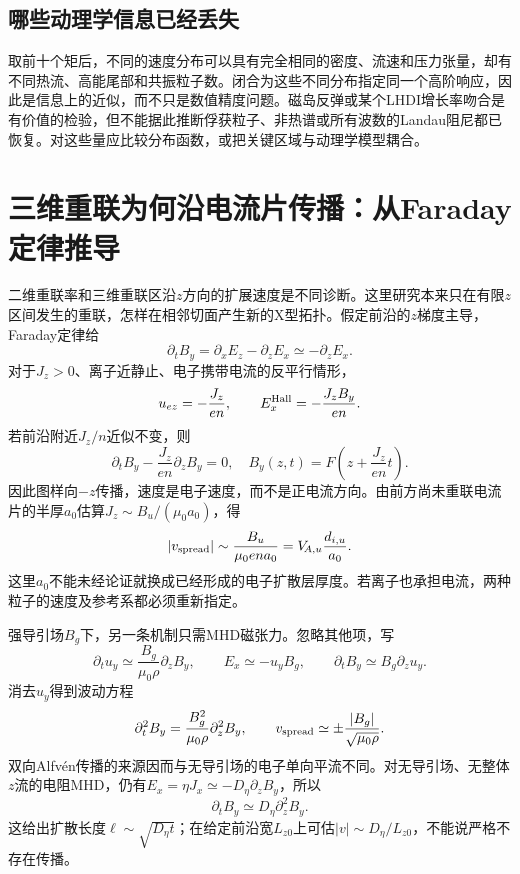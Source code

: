 \subsection{哪些动理学信息已经丢失}
取前十个矩后，不同的速度分布可以具有完全相同的密度、流速和压力张量，却有不同热流、高能尾部和共振粒子数。闭合为这些不同分布指定同一个高阶响应，因此是信息上的近似，而不只是数值精度问题。磁岛反弹或某个LHDI增长率吻合是有价值的检验，但不能据此推断俘获粒子、非热谱或所有波数的Landau阻尼都已恢复。对这些量应比较分布函数，或把关键区域与动理学模型耦合。

\section{三维重联为何沿电流片传播：从Faraday定律推导}
二维重联率和三维重联区沿$z$方向的扩展速度是不同诊断。这里研究本来只在有限$z$区间发生的重联，怎样在相邻切面产生新的X型拓扑。假定前沿的$z$梯度主导，Faraday定律给
\begin{equation}
\partial_tB_y=\partial_xE_z-\partial_zE_x\simeq-\partial_zE_x.
\end{equation}
对于$J_z>0$、离子近静止、电子携带电流的反平行情形，
\begin{equation}
 u_{ez}=-\frac{J_z}{en},\qquad E_x^{\rm Hall}=-\frac{J_zB_y}{en}.
\end{equation}
若前沿附近$J_z/n$近似不变，则
\begin{equation}
 \partial_tB_y-\frac{J_z}{en}\partial_zB_y=0,
 \quad B_y(z,t)=F\left(z+\frac{J_z}{en}t\right).
\end{equation}
因此图样向$-z$传播，速度是电子速度，而不是正电流方向。由前方尚未重联电流片的半厚$a_0$估算$J_z\sim B_u/(\mu_0a_0)$，得
\begin{equation}
 |v_{\rm spread}|\sim \frac{B_u}{\mu_0ena_0}
 =V_{\!A,u}\frac{d_{i,u}}{a_0}.
\end{equation}
这里$a_0$不能未经论证就换成已经形成的电子扩散层厚度。若离子也承担电流，两种粒子的速度及参考系都必须重新指定。

强导引场$B_g$下，另一条机制只需MHD磁张力。忽略其他项，写
\begin{equation}
 \partial_tu_y\simeq\frac{B_g}{\mu_0\rho}\partial_zB_y,
 \qquad E_x\simeq-u_yB_g,\qquad
 \partial_tB_y\simeq B_g\partial_zu_y.
\end{equation}
消去$u_y$得到波动方程
\begin{equation}
 \partial_t^2B_y=\frac{B_g^2}{\mu_0\rho}\partial_z^2B_y,
 \qquad v_{\rm spread}\simeq\pm\frac{|B_g|}{\sqrt{\mu_0\rho}}.
\end{equation}
双向Alfvén传播的来源因而与无导引场的电子单向平流不同。对无导引场、无整体$z$流的电阻MHD，仍有$E_x=\eta J_x\simeq- D_\eta\partial_zB_y$，所以
\begin{equation}
 \partial_tB_y\simeq D_\eta\partial_z^2B_y.
\end{equation}
这给出扩散长度$\ell\sim\sqrt{D_\eta t}$；在给定前沿宽$L_{z0}$上可估$|v|\sim D_\eta/L_{z0}$，不能说严格不存在传播。

